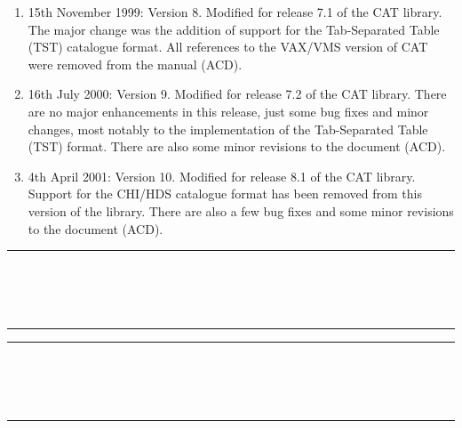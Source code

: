 \begin{enumerate}
  \item 15th November 1999: Version 8. Modified for release 7.1 of the
   CAT library.  The major change was the addition of support for the
   Tab-Separated Table (TST) catalogue format.  All references to
   the VAX/VMS version of CAT were removed from the manual (ACD).

  \item 16th July 2000: Version 9.  Modified for release 7.2 of the
   CAT library.  There are no major enhancements in this release, just
   some bug fixes and minor changes, most notably to the implementation
   of the Tab-Separated Table (TST) format.  There are also some minor
   revisions to the document (ACD).

  \item 4th April 2001: Version 10.  Modified for release 8.1 of the
   CAT library.  Support for the CHI/HDS catalogue format has been removed
   from this version of the library.  There are also a few bug fixes and
   some minor revisions to the document (ACD).

\end{enumerate}

\cleardoublepage
 \newpage
 \begin{latexonly}
   \null\vspace {5mm}
   \begin {center}
   \rule{80mm}{0.5mm} \\ [1ex]
   {\Large\bf \stardoctitle \\ [2.5ex]
              \stardocversion} \\ [2ex]
   \rule{80mm}{0.5mm}
   \end{center}   
   \vspace{20mm}

   \setlength{\parskip}{0mm}
   \latexonlytoc
   \pagebreak
   \listoftables
   \listoffigures

   \setlength{\parskip}{\medskipamount}
   \markboth{\stardocname}{\stardocname}
 \end{latexonly}

\cleardoublepage
\renewcommand{\thepage}{\arabic{page}}
\markboth{\stardocname}{\stardocname}
\setcounter{page}{1}

\null\vspace {5mm}
\begin {center}
\rule{80mm}{0.5mm} \\ [1ex]
{\Large\bf \stardoctitle \\ [2.5ex]
           \stardocversion} \\ [2ex]
\rule{80mm}{0.5mm}
\end{center}
\vspace{20mm}

